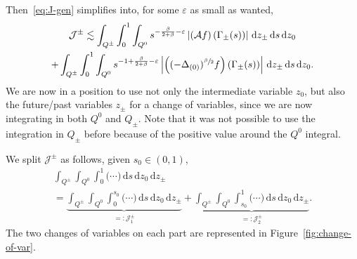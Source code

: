 \documentclass[10pt]{amsart}
\theoremstyle{definition}
\newcommand{\cA}{{\mathcal A}}
\newcommand{\cJ}{{\mathcal J}}
\newcommand{\dd}{{\, \mathrm d}}
\let\var\varepsilon
\begin{document}
Then~\eqref{eq:J-gen} simplifies into, for
some $\var$ as small as wanted,
\begin{multline*}
{\cJ^{\pm}} \lesssim \int_{Q^\pm} \int_0^1\int_{Q^0}
s^{-\frac{\beta}{2+\beta}-\var}
\left| \left(\cA f \right) (\Gamma_\pm(s))\right| \dd z_\pm \dd s \dd z_0 \\
+ \int_{Q^\pm} \int_0^1\int_{Q^0} s^{-1 + \frac{\beta}{2+\beta}-\var} \left|\left((-\Delta_{(0)})^{\sfrac{\beta}{2}}
f\right)\left(\Gamma_\pm(s) \right) \right| \dd z_\pm \dd s \dd z_0.
\end{multline*}
We are now in a position to use not only the intermediate
variable $z_0$, but also the future/past variables $z_\pm$ for a
change of variables, since we are now integrating in both $Q^0$
and $Q_\pm$. Note that it was not possible to use the integration
in $Q_\pm$ before because of the positive value around the $Q^0$
integral.

We split {$\cJ^{\pm}$} as follows, given $s_0 \in (0,1)$,
\begin{multline*}
\int_{Q^\pm} \int_{Q^0} \int_0^1
\big(\cdots \big) \dd s \dd z_0 \dd z_\pm
\\
= \underbrace{\int_{Q^\pm} \int_{Q^0} \int_0^{s_0} \big(\cdots \big) \dd s \dd z_0 \dd
z_\pm}_{=: \cJ^\pm_1} + \underbrace{\int_{Q^\pm}
\int_{Q^0} \int_{s_0}^1 \big(\cdots \big) \dd s \dd z_0 \dd z_\pm}_{=: \cJ^\pm_2}.
\end{multline*}
The two changes of variables on each part are represented in
Figure~\ref{fig:change-of-var}.
\end{document}
